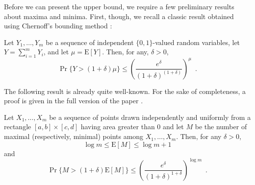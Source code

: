 \documentclass[10pt]{llncs}
\newcommand{\PROB}{\Pr}
\newcommand{\EXP}{\mathrm{E}}
\begin{document}
Before we can present the upper bound, we require a few preliminary results
about maxima and minima.  First, though, we recall a classic result 
obtained using Chernoff's bounding method \cite{c52}:

\begin{lem}
Let $Y_1,\ldots,Y_m$ be a sequence of independent $\{0,1\}$-valued
random variables, let $Y=\sum_{i=1}^m Y_i$, and let $\mu=\EXP[Y]$.
Then, for any, $\delta > 0$,
\[
   \Pr\{Y > (1+\delta)\mu\} 
     \le \left(\frac{e^{\delta}}{(1+\delta)^{(1+\delta)}}\right)^{\mu}
	\enspace .
\]
\end{lem}

The following result is already quite well-known.  For the sake of
completeness, a proof is given in the full version of the paper
\cite{dgm09}.

\begin{lem}
  Let $X_1,\ldots,X_m$ be a sequence of points drawn independently and
  uniformly from a rectangle $[a,b]\times[c,d]$ having area greater than
  0 and let $M$ be the number of maximal (respectively, minimal) points
  among $X_1,\ldots,X_m$.  Then, for any $\delta >0$,
  \begin{equation}
    \log m \le \EXP[M] \le \log m + 1
  \end{equation}
  and 
  \begin{equation}
    \PROB\{M>(1+\delta)\EXP[M]\} 
        \le \left(\frac{e^\delta}{(1+\delta)^{1+\delta}}\right)^{\log m}
		 \enspace .
  \end{equation}
\end{lem}

%
\end{document}
